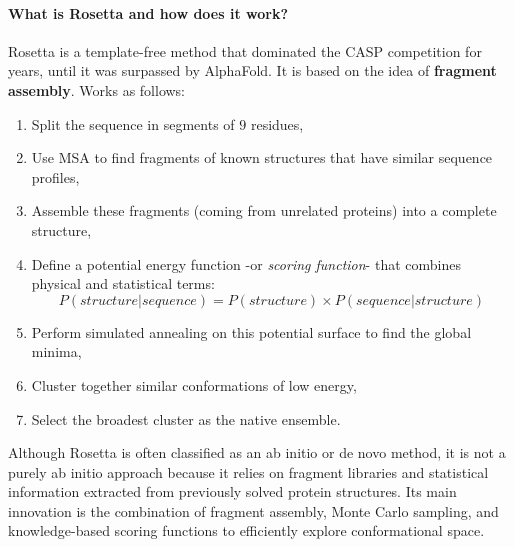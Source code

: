 \paragraph{What is Rosetta and how does it work?}
Rosetta is a template-free method that dominated the CASP competition for years, until it was surpassed by AlphaFold. 
It is based on the idea of \textbf{fragment assembly}. Works as follows:
\begin{enumerate}
    \item Split the sequence in segments of $9$ residues,
    \item Use MSA to find fragments of known structures that have similar sequence profiles,
    \item Assemble these fragments (coming from unrelated proteins) into a complete structure,
    \item Define a potential energy function -or \textit{scoring function}- that combines physical and statistical terms:
            $$
            P(structure| sequence) = P(structure) \times P(sequence | structure)
            $$
    \item Perform simulated annealing on this potential surface to find the global minima,
    \item Cluster together similar conformations of low energy,
    \item Select the broadest cluster as the native ensemble.
\end{enumerate}
Although Rosetta is often classified as an ab initio or de novo method, it is not a purely ab initio approach because it relies on fragment libraries and statistical information extracted from previously solved protein structures. Its main innovation is the combination of fragment assembly, Monte Carlo sampling, and knowledge-based scoring functions to efficiently explore conformational space.


